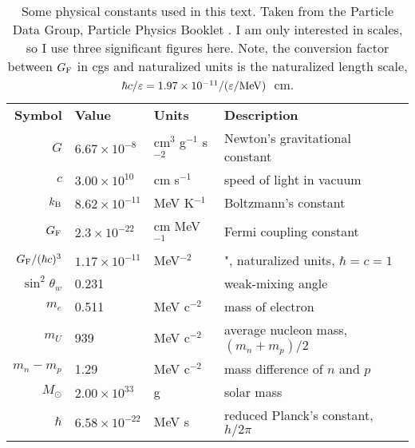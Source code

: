 \begin{table}
  \centering
  \begin{tabular}{rlll}
    \textbf{Symbol} & \textbf{Value}       & \textbf{Units}           & \textbf{Description} \\
    $G$             & $6.67\times10^{-8}$  & cm$^3$ g$^{-1}$ s$^{-2}$ & Newton's gravitational constant \\
    $c$             & $3.00\times10^{10}$  & cm s$^{-1}$              & speed of light in vacuum \\
    $k_{\rm B}$     & $8.62\times10^{-11}$ & MeV K$^{-1}$             & Boltzmann's constant \\
    $G_{\rm F}$     & $2.3\times10^{-22}$  & cm MeV$^{-1}$            & Fermi coupling constant \\
    $G_{\rm F}/(\hbar c)^3$ & $1.17\times10^{-11}$ & MeV$^{-2}$       & ", naturalized units, $\hbar=c=1$ \\
    $\sin^2\theta_w$& 0.231                &                          & weak-mixing angle \\
    $m_e$           & 0.511                & MeV c$^{-2}$             & mass of electron \\
    $m_U$           & 939                  & MeV c$^{-2}$             & average nucleon mass, $(m_n+m_p)/2$ \\
    $m_n-m_p$       & 1.29                 & MeV c$^{-2}$             & mass difference of $n$ and $p$ \\
    $M_\odot$       & $2.00\times10^{33}$  & g                        & solar mass \\
    $\hbar$         & $6.58\times10^{-22}$ & MeV s                    & reduced Planck's constant, $h/2\pi$ \\
  \end{tabular}
  \caption[Physical constants used in the text]{
    Some physical constants used in this text. Taken from the Particle Data
    Group, Particle Physics Booklet \citep{oliv2014-pdg}.
    I am only interested in scales, so I use three significant figures here.
    Note, the conversion factor between $G_{\rm F}$ in cgs and
    naturalized units is the naturalized length scale,
    $\hbar c/\varepsilon=1.97\times10^{-11}/(\varepsilon/{\rm MeV})$~cm.
  }
  \label{tab:constants}
\end{table}

